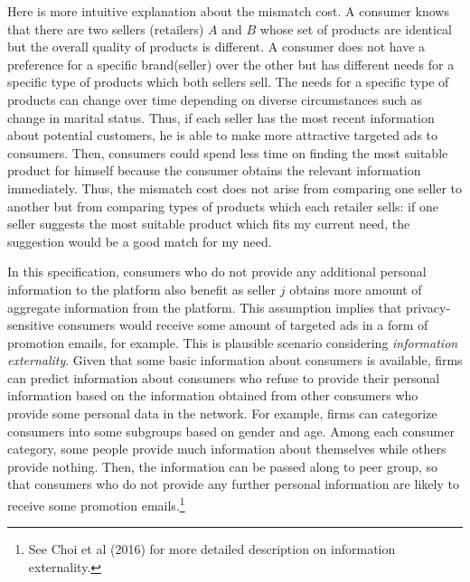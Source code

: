 \documentclass[12pt]{article}
\begin{document}
 Here is more intuitive explanation about the mismatch cost. A consumer knows that there are two sellers (retailers) $A$ and $B$ whose set of products are identical but the overall quality of products is different. A consumer does not have a preference for a specific brand(seller) over the other but has different needs for a specific type of products which both sellers sell. The needs for a specific type of products can change over time depending on diverse circumstances such as change in marital status. Thus, if each seller has the most recent information about potential customers, he is able to make more attractive targeted ads to consumers. Then, consumers could spend less time on finding the most suitable product for himself because the consumer obtains the relevant information immediately. Thus, the mismatch cost does not arise from comparing one seller to another but from comparing types of products which each retailer sells: if one seller suggests the most suitable product which fits my current need, the suggestion would be a good match for my need.
 
 In this specification, consumers who do not provide any additional personal information to the platform also benefit as seller $j$ obtains more amount of aggregate information from the platform. This assumption implies that privacy-sensitive consumers would receive some amount of targeted ads in a form of promotion emails, for example. This is plausible scenario considering \textit{information externality}. Given that some basic information about consumers is available, firms can predict information about consumers who refuse to provide their personal information based on the information obtained from other consumers who provide some personal data in the network. For example, firms can categorize consumers into some subgroups based on gender and age. Among each consumer category, some people provide much information about themselves while others provide nothing. Then, the information can be passed along to peer group, so that consumers who do not provide any further personal information are likely to receive some promotion emails.\footnote{See Choi et al (2016) for more detailed description on information externality.}
 
\end{document}
